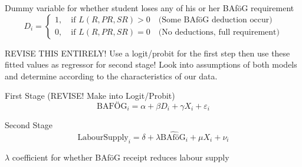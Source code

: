Dummy variable for whether student loses any of his or her BAföG requirement
\begin{equation}
D_{i} = 
\begin{cases}
  1, \quad \text{if } L(R, PR, SR) > 0 \quad \text{(Some BAföG deduction occur)} \\
  0, \quad \text{if } L(R, PR, SR) = 0 \quad \text{(No deductions, full requirement)}
\end{cases}
\end{equation}

REVISE THIS ENTIRELY! Use a logit/probit for the first step then 
use these fitted values as regressor for second stage! 
Look into assumptions of both models and determine according to the 
characteristics of our data. 


First Stage (REVISE! Make into Logit/Probit)
\[ 
\text{BAFÖG}_{i} = \alpha + \beta D_{i} + \gamma X_{i} + \varepsilon_{i}
\]

Second Stage
\[ 
 \text{LabourSupply}_{i} = \delta + \lambda \widehat{\text{BAföG}}_{i} + \mu X_{i} + \nu_{i}
\]

\( \lambda \) coefficient for whether BAföG receipt reduces labour supply





